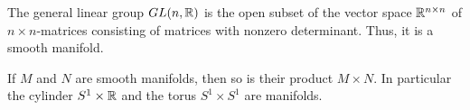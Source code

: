 \begin{frame}
  \begin{example}
    The general linear group $GL(n, \mathbb R)$ is the open subset of
    the vector space $\mathbb R^{n \times n}$ of $n \times n$-matrices consisting
    of matrices with nonzero determinant. Thus, it is a smooth manifold.
  \end{example}
  \begin{example}
    If $M$ and $N$ are smooth manifolds, then so is their product $M \times N$.
    In particular the cylinder $S^1 \times \mathbb R$ and the
    torus $S^1 \times S^1$ are manifolds.
  \end{example}

\end{frame}
